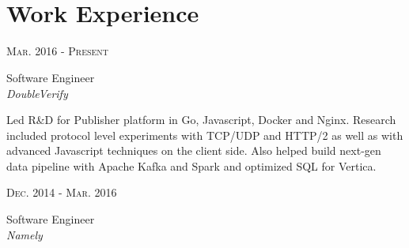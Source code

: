 \documentclass[10pt]{article} %
\begin{document}
\color{text1} %


\par{\\ %
\par{}\\
	

\begin{minipage}[t]{0.5\textwidth} %
\vspace{0pt} %
	

\section{Work Experience} 


{\raggedleft\textsc{Mar. 2016 - Present}\par}
{\raggedright\large Software Engineer\\
\textit{DoubleVerify}\\[5pt]}

\small{Led R\&D for Publisher platform in Go, Javascript, Docker and Nginx. 
  Research included protocol level experiments with TCP/UDP and HTTP/2 as well 
  as with advanced Javascript techniques on the client side. Also helped build 
  next-gen data pipeline with Apache Kafka and Spark and optimized SQL for 
  Vertica.}\\


{\raggedleft\textsc{Dec. 2014 - Mar. 2016}\par}
{\raggedright\large Software Engineer\\
\textit{Namely}\\[5pt]}


\end{minipage}}
\end{document}
